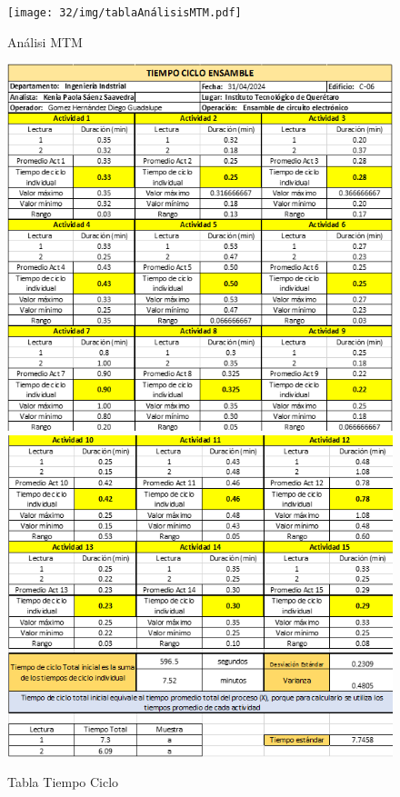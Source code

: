     \begin{figure}[H]
        \centering
        \texttt{[image: 32/img/tablaAnálisisMTM.pdf]}
        \caption{Análisi MTM}
        \label{fig:enter-label}
    \end{figure}
    \begin{figure}[H]
        \centering
        \includegraphics[scale=0.5]{32/img/tiempoCiclo1.png}
        \label{fig:enter-label}
        \centering
        \includegraphics[scale=0.5]{32/img/tiempoCiclo2.png}
        \caption{Tabla Tiempo Ciclo}
    \end{figure}
